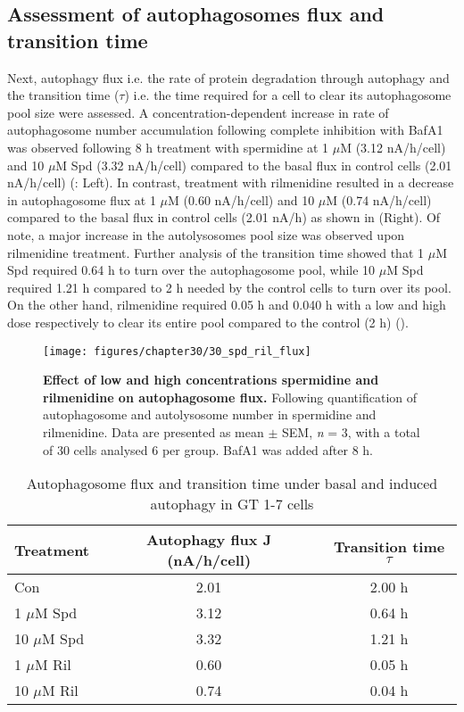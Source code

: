 \subsection{Assessment of autophagosomes flux and transition time}
Next, autophagy flux i.e. the rate of protein degradation through autophagy \citep{klionsky2016,loos2014} and the transition time ($\tau$) i.e. the time required for a cell to clear its autophagosome pool size \citep{DuToit2018b,loos2014} were assessed. A concentration-dependent increase in rate of autophagosome number accumulation following complete inhibition with BafA1 was observed following 8 h treatment with spermidine at 1 $\mu$M (3.12 nA/h/cell) and 10 $\mu$M Spd (3.32 nA/h/cell) compared to the basal flux in control cells (2.01 nA/h/cell) (: Left). In contrast, treatment with rilmenidine resulted in a decrease in autophagosome flux at 1 $\mu$M (0.60 nA/h/cell) and 10 $\mu$M (0.74 nA/h/cell) compared to the basal flux in control cells (2.01 nA/h) as shown in  (Right). Of note, a major increase in the autolysosomes pool size was observed upon rilmenidine treatment. Further analysis of the transition time showed that 1 $\mu$M Spd required 0.64 h to turn over the autophagosome pool, while 10 $\mu$M Spd required 1.21 h compared to 2 h needed by the control cells to turn over its pool. On the other hand, rilmenidine required 0.05 h and 0.040 h with a low and high dose respectively to clear its entire pool compared to the control (2 h) ().

\begin{figure}[!htbp]
\center
  \texttt{[image: figures/chapter30/30\_spd\_ril\_flux]}
  \caption[Effect of low and high concentrations spermidine and rilmenidine on autophagosome flux]{\textbf{Effect of low and high concentrations spermidine and rilmenidine on autophagosome flux.} Following quantification of autophagosome and autolysosome number in spermidine and rilmenidine. Data are presented as mean $\pm$ SEM, \textit{n} = 3, with a total of 30 cells analysed 6 per group. BafA1 was added after 8 h.}
  \label{fig:30_spd_ril_flux}
\end{figure} 

\begin{table}[!htbp]
\centering
\caption[Autophagosome flux and transition time under basal and induced autophagy in GT 1-7 cells]{Autophagosome flux and transition time under basal and induced autophagy in GT 1-7 cells}
\label{tab:30_flux}
  \begin{tabular}{lcc}
\toprule
Treatment & Autophagy flux J (nA/h/cell) & Transition time $\tau$\\
\midrule
Con & 2.01 & 2.00 h \\
1 $\mu$M Spd & 3.12 & 0.64 h \\
10 $\mu$M Spd & 3.32 & 1.21 h \\
1 $\mu$M Ril & 0.60 & 0.05 h \\
10 $\mu$M Ril & 0.74 & 0.04 h \\
\end{tabular}
\end{table}

